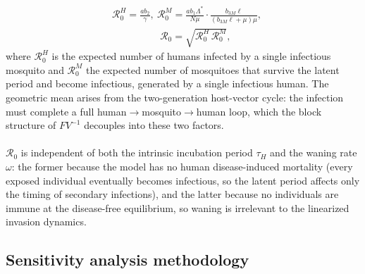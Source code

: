 \documentclass[a4paper,fleqn]{cas-dc}
\begin{document}
\begin{equation}\label{eq:R0_factors}
\begin{aligned}
&\mathcal{R}_0^H=\frac{ab_2}{\gamma},\ 
\mathcal{R}_0^M=\frac{ab_1\Lambda^\ast}{N\mu}\cdot\frac{b_{3M}\ell}{(b_{3M}\ell+\mu)\mu},\\
&\ \ \ \ \ \ \ \ \ \ \ \ \ \ \ \ \ \ \ \ \ \ \mathcal{R}_0=\sqrt{\mathcal{R}_0^H\,\mathcal{R}_0^M},
\end{aligned}
\end{equation}
where $\mathcal{R}_0^H$ is the expected number of humans infected by a single
infectious mosquito and $\mathcal{R}_0^M$ the expected number of mosquitoes
that survive the latent period and become infectious, generated by a single
infectious human. The geometric mean arises from the two-generation
host-vector cycle: the infection must complete a full
human$\to$mosquito$\to$human loop, which the block structure of $FV^{-1}$
decouples into these two factors.
\\\\
$\mathcal{R}_0$ is independent of both the intrinsic incubation period
$\tau_H$ and the waning rate $\omega$: the former because the model has no
human disease-induced mortality (every exposed individual eventually becomes
infectious, so the latent period affects only the timing of secondary
infections), and the latter because no individuals are immune at the
disease-free equilibrium, so waning is irrelevant to the linearized invasion
dynamics.

\subsection{Sensitivity analysis methodology}
\label{sec:sensitivity}
\end{document}
